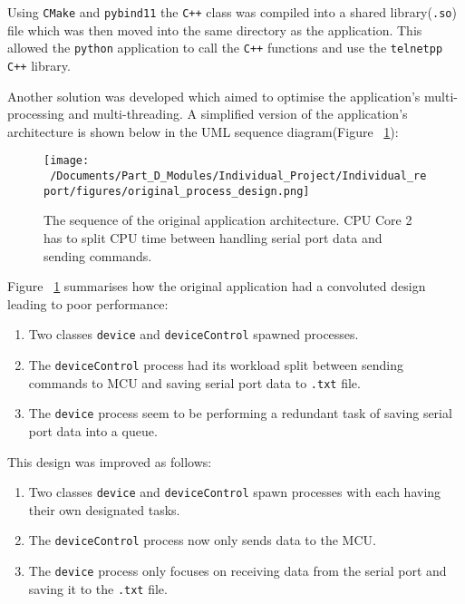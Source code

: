 Using \texttt{CMake} and \texttt{pybind11} the \texttt{C++} class was compiled into a shared library(\texttt{.so}) file which was then moved into the same directory as the application. This allowed the \texttt{python} application to call the \texttt{C++} functions and use the \texttt{telnetpp} \texttt{C++} library. 

Another solution was developed which aimed to optimise the application's multi-processing and multi-threading. A simplified version of the application's architecture is shown below in the UML sequence diagram(Figure ~\ref{fig:original_application_arch}):

\begin{figure}[htbp] %
	\centering
	\texttt{[image: ~/Documents/Part\_D\_Modules/Individual\_Project/Individual\_report/figures/original\_process\_design.png]} %
	\caption{The sequence of the original application architecture. CPU Core 2 has to split CPU time between handling serial port data and sending commands.}
	\label{fig:original_application_arch} %
\end{figure}

Figure ~\ref{fig:original_application_arch} summarises how the original application had a convoluted design leading to poor performance:

\begin{enumerate}
	\item Two classes \texttt{device} and \texttt{deviceControl} spawned processes. 
	\item The \texttt{deviceControl} process had its workload split between sending commands to MCU and saving serial port data to \texttt{.txt} file.  
	\item The \texttt{device} process seem to be performing a redundant task of saving serial port data into a queue. 
\end{enumerate}

This design was improved as follows:

\begin{enumerate}
	\item Two classes \texttt{device} and \texttt{deviceControl} spawn processes with each having their own designated tasks.
	\item The \texttt{deviceControl} process now only sends data to the MCU.   
	\item The \texttt{device} process only focuses on receiving data from the serial port and saving it to the \texttt{.txt} file. 
\end{enumerate}

